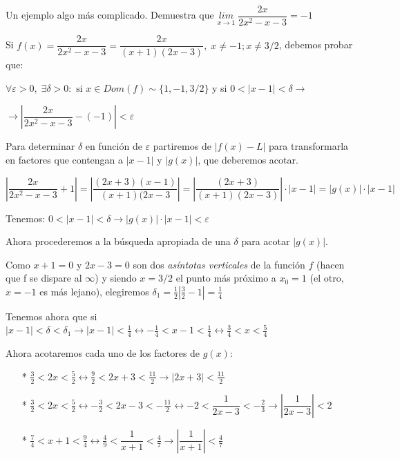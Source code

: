 		\begin{ejem} Un ejemplo algo más complicado.
		Demuestra que $\underset{x\to 1}{lim}\;{\dfrac{2x}{2x^2-x-3}}=-1$
		
		Si $f(x)=\dfrac{2x}{2x^2-x-3} = \dfrac {2x}{(x+1)(2x-3)},\; x\neq-1; x\neq 3/2$, debemos probar que:
		
		$\forall \varepsilon>0,\; \exists \delta>0: \mbox{ si } x\in Dom(f)\sim \{ 1, -1, 3/2\}$ y si $0<|x-1|<\delta \to$ 
		
		
		\hspace{10mm}
		$\to\left| \dfrac{2x}{2x^2-x-3}-(-1) \right|<\varepsilon$
			
		 Para determinar $\delta$ en función de $\varepsilon$ partiremos de $|f(x)-L|$ para transformarla en factores que contengan a $|x-1|$ y $|g(x)|$, que deberemos acotar.
		
		 $\left| \dfrac{2x}{2x^2-x-3}+1 \right|= \left| \dfrac{(2x+3)(x-1)}{(x+1)(2x-3} \right|=\left| \dfrac{(2x+3)}{(x+1)(2x-3)} \right|\cdot |x-1|=|g(x)|\cdot|x-1|$
		
		Tenemos:  $0<|x-1|<\delta \to |g(x)|\cdot|x-1|<\varepsilon$
		
		 Ahora procederemos a la búsqueda apropiada de una $\delta$ para acotar $|g(x)|$.
		
		Como $x+1=0$ y $2x-3=0$ son dos \emph{asíntotas verticales} de la función $f$ (hacen que f se dispare al $\infty$) y siendo $x=3/2$ el punto más próximo a $x_0=1$ (el otro, $x=-1$ es más lejano), elegiremos $\delta_1=\frac 1 2 |\frac 3 2 - 1|=\frac 1 4$
		
		 Tenemos ahora que si $|x-1|<\delta<\delta_1 \to |x-1|<\frac 1 4 \leftrightarrow -\frac 1 4 < x-1 < \frac 1 4 \leftrightarrow \frac 3 4 < x < \frac 5 4$
		
		 Ahora acotaremos cada uno de los factores de $g(x)$:
		
		\begin{itemize}
		
			\item [*] $\frac 3 2 < 2x < \frac 5 2 \leftrightarrow \frac 9 2 < 2x+3 < \frac {11} {2} \to |2x+3|<\frac {11}2$
			\item [*] $\frac 3 2 < 2x < \frac 5 2 \leftrightarrow -\frac {3} 2 < 2x-3 < -\frac {11} {2} \leftrightarrow -2 < \dfrac {1}{2x-3}< -\frac {2}{3}\to \left| \dfrac {1}{2x-3} \right|<2$
			\item [*] $\frac 7 4 < x+1 < \frac 9 4 \leftrightarrow \frac 4 9 < \dfrac {1}{x+1} < \frac 4 7 \to \left| \dfrac {1}{x+1} \right| <\frac 4 7$
		\end{itemize}
		

\end{ejem}

